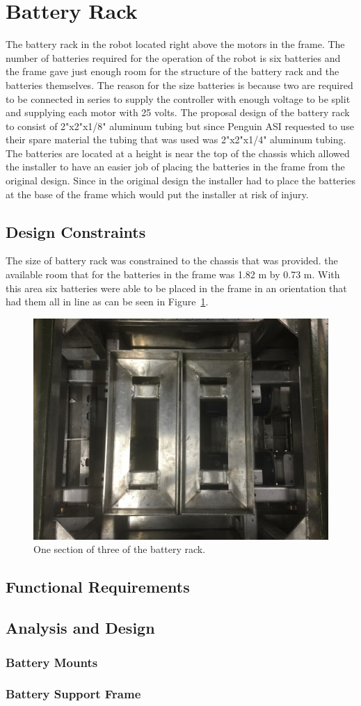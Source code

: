 \section{Battery Rack}
The battery rack in the robot located right above the motors in the frame. The number of batteries required for the operation of the robot is six batteries and the frame gave just enough room for the structure of the battery rack and the batteries themselves. The reason for the size batteries is because two are required to be connected in series to supply the controller with enough voltage to be split and supplying each motor with 25 volts. The proposal design of the battery rack to consist of 2"x2"x1/8" aluminum tubing but since Penguin ASI requested to use their spare material the tubing that was used was 2"x2"x1/4" aluminum tubing. The batteries are located at a height is near the top of the chassis which allowed the installer to have an easier job of placing the batteries in the frame from the original design. Since in the original design the installer had to place the batteries at the base of the frame which would put the installer at risk of injury. 
\subsection{Design Constraints}
The size of battery rack was constrained to the chassis that was provided. the available room that for the batteries in the frame was 1.82 m by 0.73 m. With this area six batteries were able to be placed in the frame in an orientation that had them all in line as can be seen in Figure~\ref{fig:battery_rack_section}.
\begin{figure}[htbp]
	\includegraphics[width=\linewidth]{images/battery_rack_mid_bld.jpg}
	\caption{One section of three of the battery rack.}
	\label{fig:battery_rack_section}
\end{figure}
\subsection{Functional Requirements}
\subsection{Analysis and Design}
\subsubsection{Battery Mounts}
\subsubsection{Battery Support Frame}
